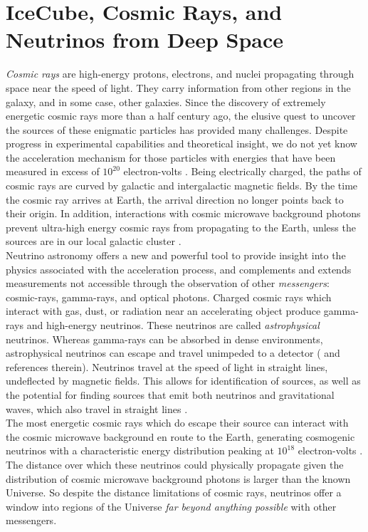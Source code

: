 \documentclass[../../../main.tex]{subfiles}
\begin{document}
\section{IceCube, Cosmic Rays, and Neutrinos from Deep Space}
\label{sec:professional}

\textit{Cosmic rays} are high-energy protons, electrons, and nuclei propagating through space near the speed of light.  They carry information from other regions in the galaxy, and in some case, other galaxies.  Since the discovery of extremely energetic cosmic rays more than a half century ago, the elusive quest to uncover the sources of these enigmatic particles has provided many challenges.  Despite progress in experimental capabilities and theoretical insight, we do not yet know the acceleration mechanism for those particles with energies that have been measured in excess of $10^{20}$ electron-volts \cite{10.1088/1742-6596/1766/1/012002}.  Being electrically charged, the paths of cosmic rays are curved by galactic and intergalactic magnetic fields.  By the time the cosmic ray arrives at Earth, the arrival direction no longer points back to their origin.  In addition, interactions with cosmic microwave background photons prevent ultra-high energy cosmic rays from propagating to the Earth, unless the sources are in our local galactic cluster \cite{PhysRevLett.16.748} \cite{1966JETPL...4...78Z}.
\\
\vspace{0.25cm}
Neutrino astronomy offers a new and powerful tool to provide insight into the physics associated with the acceleration process, and complements and extends measurements not accessible through the observation of other \textit{messengers}: cosmic-rays, gamma-rays, and  optical photons. Charged cosmic rays which interact with gas, dust, or radiation near an accelerating object produce gamma-rays and high-energy neutrinos.  These neutrinos are called \textit{astrophysical} neutrinos. Whereas gamma-rays can be absorbed in dense environments, astrophysical neutrinos can escape and travel unimpeded to a detector (\cite{Astro2020_1} and references therein). Neutrinos travel at the speed of light in straight lines, undeflected by magnetic fields.  This allows for identification of sources, as well as the potential for finding sources that emit both neutrinos and gravitational waves, which also travel in straight lines \cite{10.3847/2041-8213/ab9d24}.
\\
\vspace{0.25cm}
The most energetic cosmic rays which do escape their source can interact with the cosmic microwave background en route to the Earth, generating cosmogenic neutrinos with a characteristic energy distribution peaking at $10^{18}$ electron-volts \cite{10.1007/bf00645585} \cite{BERESINSKY1969423}. The distance over which these neutrinos could physically propagate given the distribution of cosmic microwave background photons is larger than the known Universe.  So despite the distance limitations of cosmic rays, neutrinos offer a window into regions of the Universe \textit{far beyond anything possible} with other messengers.
\end{document}
